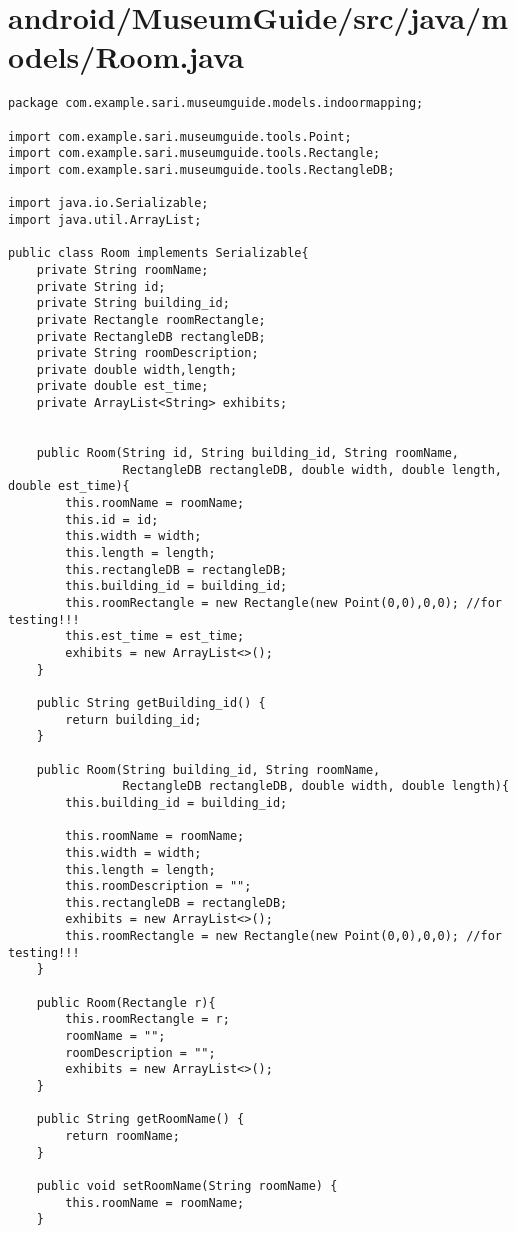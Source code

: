 \section{android/MuseumGuide/src/java/models/Room.java}
\begin{lstlisting}package com.example.sari.museumguide.models.indoormapping;

import com.example.sari.museumguide.tools.Point;
import com.example.sari.museumguide.tools.Rectangle;
import com.example.sari.museumguide.tools.RectangleDB;

import java.io.Serializable;
import java.util.ArrayList;

public class Room implements Serializable{
    private String roomName;
    private String id;
    private String building_id;
    private Rectangle roomRectangle;
    private RectangleDB rectangleDB;
    private String roomDescription;
    private double width,length;
    private double est_time;
    private ArrayList<String> exhibits;


    public Room(String id, String building_id, String roomName,
                RectangleDB rectangleDB, double width, double length, double est_time){
        this.roomName = roomName;
        this.id = id;
        this.width = width;
        this.length = length;
        this.rectangleDB = rectangleDB;
        this.building_id = building_id;
        this.roomRectangle = new Rectangle(new Point(0,0),0,0); //for testing!!!
        this.est_time = est_time;
        exhibits = new ArrayList<>();
    }

    public String getBuilding_id() {
        return building_id;
    }

    public Room(String building_id, String roomName,
                RectangleDB rectangleDB, double width, double length){
        this.building_id = building_id;

        this.roomName = roomName;
        this.width = width;
        this.length = length;
        this.roomDescription = "";
        this.rectangleDB = rectangleDB;
        exhibits = new ArrayList<>();
        this.roomRectangle = new Rectangle(new Point(0,0),0,0); //for testing!!!
    }

    public Room(Rectangle r){
        this.roomRectangle = r;
        roomName = "";
        roomDescription = "";
        exhibits = new ArrayList<>();
    }

    public String getRoomName() {
        return roomName;
    }

    public void setRoomName(String roomName) {
        this.roomName = roomName;
    }


\end{lstlisting}
